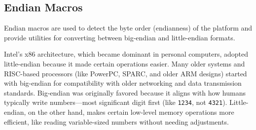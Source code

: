 \subsection{Endian Macros}
\label{Endian Macros}
\begin{NexMainBox}
	\begin{NexMainBox}
		Endian macros are used to detect the byte order (endianness) of the platform and provide utilities for converting between big-endian and little-endian formats.
	\end{NexMainBox}
	\begin{NexMainBox}[dark, crnA, title=\textbf{Why does Intel use little-endian while older processors use big-endian?}]
		Intel’s x86 architecture, which became dominant in personal computers, adopted little-endian because it made certain operations easier. Many older systems and RISC-based processors (like PowerPC, SPARC, and older ARM designs) started with big-endian for compatibility with older networking and data transmission standards.
		Big-endian was originally favored because it aligns with how humans typically write numbers—most significant digit first (like \texttt{1234}, not \texttt{4321}). Little-endian, on the other hand, makes certain low-level memory operations more efficient, like reading variable-sized numbers without needing adjustments.
	\end{NexMainBox}
	\begin{NexMainBox}[dark, crnA, title=\textbf{Pros and Cons of Each Endianness}]
		\begin{NexListDark}
		\end{NexListDark}
	\end{NexMainBox}
\end{NexMainBox}


